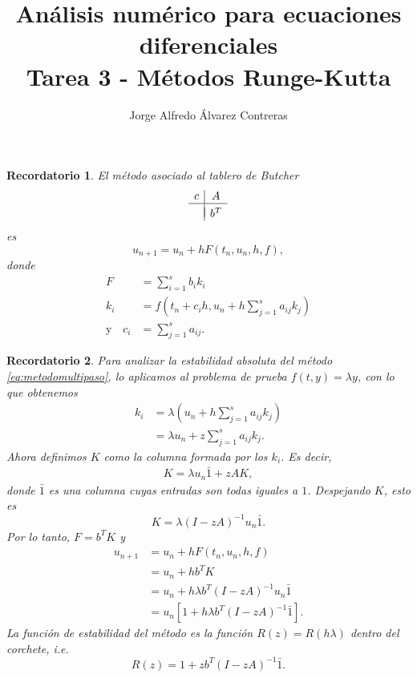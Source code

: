 \documentclass[11pt]{article}
\title{Análisis numérico para ecuaciones diferenciales \\
Tarea 3 - Métodos Runge-Kutta}
\author{Jorge Alfredo Álvarez Contreras}
\newtheorem{reminder}{Recordatorio}
\begin{document}
\maketitle

\begin{reminder}
  El método asociado al tablero de Butcher
  \begin{equation}
    \begin{array}{c|c}
      c & A \\
      \hline \\[-3mm]
        & b^T
    \end{array}
  \end{equation}
  es
  \begin{equation}\label{eq:metodomultipaso}
    u_{n+1} = u_n + h F(t_n,u_n,h,f),
  \end{equation}
  donde
  \begin{align}
    F
      &= \sum_{i=1}^{s}b_ik_i
      \\[-3mm]
    k_i
      &= f(t_n+c_ih, u_n+h \sum_{j=1}^{s}a_{ij} k_j)
      \\[-4mm]
    \text{y} \quad
    c_i
      &= \sum_{j=1}^{s}a_{ij}
  .\end{align}
\end{reminder}

\begin{reminder}
  Para analizar la estabilidad absoluta del método
  \eqref{eq:metodomultipaso}, lo aplicamos al problema de prueba
  $f(t,y)=\lambda y$, con lo que obtenemos
  \begin{align}
    k_i
    &= \lambda(u_n+h \sum_{j=1}^{s}a_{ij} k_j) \\
    &= \lambda u_n+z \sum_{j=1}^{s}a_{ij} k_j
  .\end{align}
  Ahora definimos $K$ como la columna formada por los $k_i$. Es decir,
  \begin{align}
    K = \lambda u_n\bar 1+zAK
  ,\end{align}
  donde $\bar 1$ es una columna cuyas entradas son todas iguales a
  $1$. Despejando $K$, esto es
  \begin{equation}
    K=\lambda (I-zA)^{-1}u_n\bar 1
  .\end{equation}
  Por lo tanto, $F=b^{T}K$ y
  \begin{align}
    u_{n+1}
    &= u_n + hF(t_n,u_n,h,f) \\
    &= u_n + hb^TK \\
    &= u_n + h\lambda b^T(I-zA)^{-1}u_n\bar 1 \\
    &= u_n[1 + h\lambda b^T(I-zA)^{-1}\bar 1]
  .\end{align}
  La función de estabilidad del método es la función
  $R(z)=R(h\lambda)$ dentro del corchete, i.e.
  \begin{equation}
    R(z) = 1 + zb^T(I-zA)^{-1}\bar 1
  .\end{equation}
\end{reminder}
\end{document}
